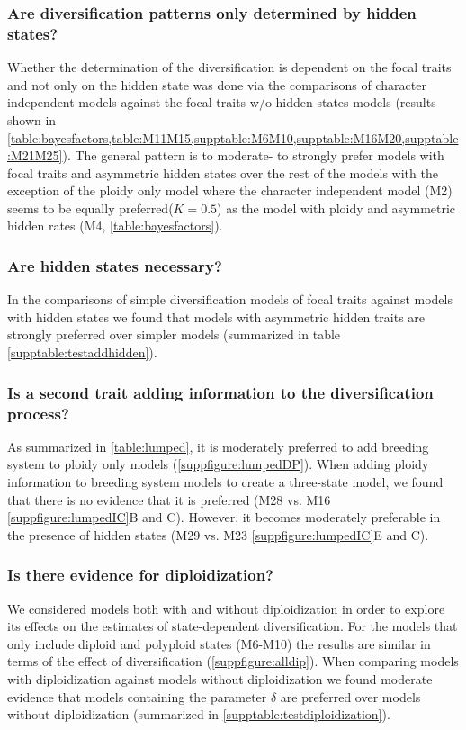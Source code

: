 \subsubsection{Are diversification patterns only determined by hidden states?}
Whether the determination of the diversification is dependent on the focal traits and not only on the hidden state was done via the comparisons of character independent models against the focal traits w/o hidden states models (results shown in  \cref{table:bayesfactors,table:M11M15,supptable:M6M10,supptable:M16M20,supptable:M21M25}).
The general pattern is to moderate- to strongly prefer models with focal traits and asymmetric hidden states over the rest of the models with the exception of the ploidy only model where the character independent model (M2) seems to be equally preferred($K=0.5$) as the model with ploidy and asymmetric hidden rates (M4, \cref{table:bayesfactors}).

\subsubsection{Are hidden states necessary?}
In the comparisons of simple diversification models of focal traits against models with hidden states we found that models with asymmetric hidden traits are strongly preferred over simpler models (summarized in table \cref{supptable:testaddhidden}).

\subsubsection{Is a second trait adding information to the diversification process?}
As summarized in  \cref{table:lumped}, it is moderately preferred to add breeding system to ploidy only models (\cref{suppfigure:lumpedDP}).
When adding ploidy information to breeding system models to create a three-state model, we found that there is no evidence that it is preferred (M28 vs. M16 \cref{suppfigure:lumpedIC}B and C). 
However, it becomes moderately preferable in the presence of hidden states (M29 vs. M23  \cref{suppfigure:lumpedIC}E and C).

\subsubsection{Is there evidence for diploidization?}
We considered models both with and without diploidization in order to explore its effects on the estimates of state-dependent diversification.
For the models that only include diploid and polyploid states (M6-M10) the results are similar in terms of the effect of diversification (\cref{suppfigure:alldip}).
When comparing models with diploidization against models without diploidization we found moderate evidence that models containing the parameter $\delta$ are preferred over models without diploidization (summarized in \cref{supptable:testdiploidization}).


